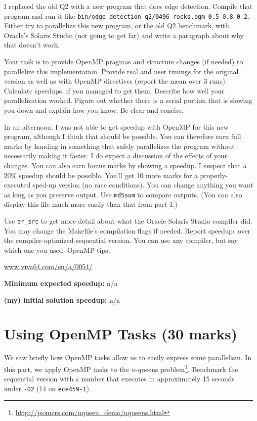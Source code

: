 \documentclass[letterpaper,10pt]{article}
\begin{document}
I replaced the old Q2 with a new program that does edge detection.
Compile that program and run it like {\tt bin/edge_detection 
q2/0496_rocks.pgm 0.5 0.8 0.2}.  Either try to parallelize this new
program, or the old Q2 benchmark, with Oracle's Solaris Studio (not
going to get far) and write a paragraph about why that doesn't work.

Your task is to provide OpenMP pragmas and structure changes (if
needed) to parallelize this implementation. Provide real and user
timings for the original version as well as with OpenMP directives
(report the mean over 3 runs).  Calculate speedups, if you managed to
get them. Describe how well your parallelization worked. Figure out
whether there is a serial portion that is slowing you down and explain
how you know. Be clear and concise.

In an afternoon, I was not able to get speedup with OpenMP for this
new program, although I think that should be possible. You can
therefore earn full marks by handing in something that safely
parallelizes the program without necessarily making it faster. I do
expect a discussion of the effects of your changes. You can also earn
bonus marks by showing a speedup.  I suspect that a 20\% speedup
should be possible. You'll get 10 more marks for a properly-executed
sped-up version (no race conditions). You can change anything you want
as long as you preserve output. Use {\tt md5sum} to compare
outputs. (You can also display this file much more easily than that
from part 1.)

\vspace*{1em}
 Use {\tt er\_src} to get more detail about what the Oracle
Solaris Studio compiler did.  You may change the
Makefile's compilation flags if needed. Report speedups over the
compiler-optimized sequential version.  You can use any compiler, but
say which one you used. OpenMP tips:
\begin{center}
  \url{www.viva64.com/en/a/0054/}
\end{center}

\squishlist
  \item {\bf Minimum expected speedup:} n/a
  \item {\bf (my) initial solution speedup:} n/a
\squishend

\section*{Using OpenMP Tasks (30 marks)}

We saw briefly how OpenMP tasks allow us to easily express some parallelism.
In this part, we apply OpenMP tasks to the $n$-queens
problem\footnote{\url{http://jsomers.com/nqueen_demo/nqueens.html}}.
Benchmark the sequential version with a number that executes in approximately
15 seconds under {\tt -O2} (14 on {\tt ece459-1}).
\end{document}
